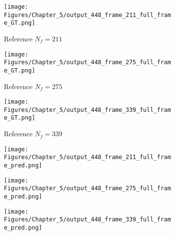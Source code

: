 \begin{figure} [!ht]
	\centering
	\begin{subfigure}[b]{.32\textwidth}
		\centering
		\texttt{[image: Figures/Chapter\_5/output\_448\_frame\_211\_full\_frame\_GT.png]}
		\caption{Reference $N_f=211$}
		\label{fig:ref_448_full_211}
	\end{subfigure}
	\hfill
	\begin{subfigure}[b]{.32\textwidth}
		\centering
		\texttt{[image: Figures/Chapter\_5/output\_448\_frame\_275\_full\_frame\_GT.png]}
		\caption{Reference $N_f=275$}
		\label{fig:ref_448_full_275}
	\end{subfigure}
	\hfill
	\begin{subfigure}[b]{.32\textwidth}
		\centering
		\texttt{[image: Figures/Chapter\_5/output\_448\_frame\_339\_full\_frame\_GT.png]}
		\caption{Reference $N_f=339$}
		\label{fig:ref_448_full_339}	
	\end{subfigure}
	\hfill
	\begin{subfigure}[b]{.32\textwidth}
		\centering
		\texttt{[image: Figures/Chapter\_5/output\_448\_frame\_211\_full\_frame\_pred.png]}
		\caption{}
		\label{fig:pred_448_full_211}
	\end{subfigure}
	\hfill
	\begin{subfigure}[b]{.32\textwidth}
		\centering
		\texttt{[image: Figures/Chapter\_5/output\_448\_frame\_275\_full\_frame\_pred.png]}
		\caption{}
		\label{fig:pred_448_full_275}
	\end{subfigure}
	\hfill
	\begin{subfigure}[b]{.32\textwidth}
		\centering
		\texttt{[image: Figures/Chapter\_5/output\_448\_frame\_339\_full\_frame\_pred.png]}
		\caption{}
		\label{fig:pred_448_full_339}	
	\end{subfigure}
	\caption{}
	\label{fig:num_results_CS_448}
\end{figure}

